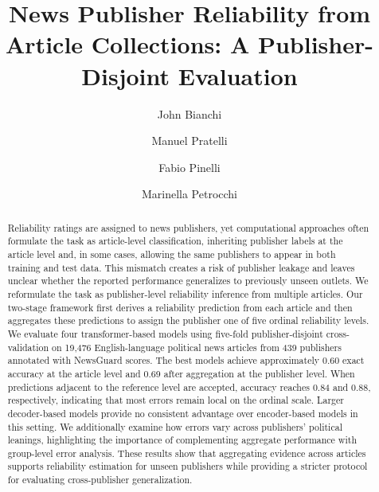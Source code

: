 \documentclass[runningheads]{llncs}
\newif\ifanonymous
\begin{document}
\title{News Publisher Reliability from Article Collections: A Publisher-Disjoint Evaluation}

\ifanonymous
  \author{Anonymous Author(s)}
  \authorrunning{Anonymous Author(s)}
  \institute{Affiliation withheld for double-blind review}
\else
  \author{%
  John Bianchi \and
  Manuel Pratelli \and
  Fabio Pinelli \and
  Marinella Petrocchi}

\fi

\maketitle

\begin{abstract}
Reliability ratings are assigned to news publishers, yet computational approaches often formulate the task as article-level classification, inheriting publisher labels at the article level and, in some cases, allowing the same publishers to appear in both training and test data. This mismatch creates a risk of publisher leakage and leaves unclear whether the reported performance generalizes to previously unseen outlets. We reformulate the task as publisher-level reliability inference from multiple articles. Our two-stage framework first derives a reliability prediction from each article and then aggregates these predictions to assign the publisher one of five ordinal reliability levels. We evaluate four transformer-based models using five-fold publisher-disjoint cross-validation on 19,476 English-language political news articles from 439 publishers annotated with NewsGuard scores. The best models achieve approximately 0.60 exact accuracy at the article level and 0.69 after aggregation at the publisher level. When predictions adjacent to the reference level are accepted, accuracy reaches 0.84 and 0.88, respectively, indicating that most errors remain local on the ordinal scale. Larger decoder-based models provide no consistent advantage over encoder-based models in this setting. We additionally examine how errors vary across publishers' political leanings, highlighting the importance of complementing aggregate performance with group-level error analysis. These results show that aggregating evidence across articles supports reliability estimation for unseen publishers while providing a stricter protocol for evaluating cross-publisher generalization.

\end{abstract}
\end{document}

